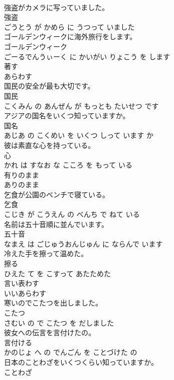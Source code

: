 \documentclass[8pt]{extreport}
\begin{document}
\begin{CJK}{UTF8}{min}
\\	強盗がカメラに写っていました。	
\\	強盗 
\\	ごうとう が かめら に うつって いました			
\\	ゴールデンウィークに海外旅行をします。	
\\	ゴールデンウィーク 
\\	ごーるでんうぃーく に かいがい りょこう を します			
\\	著す	
\\	あらわす			
\\	国民の安全が最も大切です。	
\\	国民 
\\	こくみん の あんぜん が もっとも たいせつ です			
\\	アジアの国名をいくつ知っていますか。	
\\	国名 
\\	あじあ の こくめい を いくつ しって います か			
\\	彼は素直な心を持っている。	
\\	心 
\\	かれ は すなお な こころ を もって いる			
\\	有りのまま	
\\	ありのまま			
\\	乞食が公園のベンチで寝ている。	
\\	乞食 
\\	こじき が こうえん の べんち で ねて いる			
\\	名前は五十音順に並んでいます。	
\\	五十音 
\\	なまえ は ごじゅうおんじゅん に ならんで います			
\\	冷えた手を擦って温めた。	
\\	擦る 
\\	ひえた て を こすって あたためた			
\\	言い表わす	
\\	いいあらわす			
\\	寒いのでこたつを出しました。	
\\	こたつ 
\\	さむい の で こたつ を だしました			
\\	彼女への伝言を言付けたの。	
\\	言付ける 
\\	かのじょ へ の でんごん を ことづけた の			
\\	日本のことわざをいくつくらい知っていますか。	
\\	ことわざ 

\end{CJK}
\end{document}
